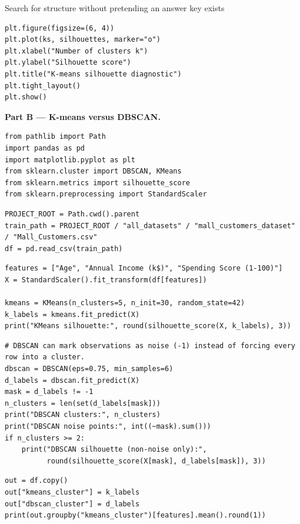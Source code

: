 \begin{labproject}{Search for structure without pretending an answer key exists}
\begin{lstlisting}[style=mlpython]
plt.figure(figsize=(6, 4))
plt.plot(ks, silhouettes, marker="o")
plt.xlabel("Number of clusters k")
plt.ylabel("Silhouette score")
plt.title("K-means silhouette diagnostic")
plt.tight_layout()
plt.show()
\end{lstlisting}

\medskip\noindent\textbf{Part B --- K-means versus DBSCAN.}\par
\begin{lstlisting}[style=mlpython]
from pathlib import Path
import pandas as pd
import matplotlib.pyplot as plt
from sklearn.cluster import DBSCAN, KMeans
from sklearn.metrics import silhouette_score
from sklearn.preprocessing import StandardScaler
\end{lstlisting}

\begin{lstlisting}[style=mlpython]
PROJECT_ROOT = Path.cwd().parent
train_path = PROJECT_ROOT / "all_datasets" / "mall_customers_dataset" / "Mall_Customers.csv"
df = pd.read_csv(train_path)
\end{lstlisting}

\begin{lstlisting}[style=mlpython]
features = ["Age", "Annual Income (k$)", "Spending Score (1-100)"]
X = StandardScaler().fit_transform(df[features])

kmeans = KMeans(n_clusters=5, n_init=30, random_state=42)
k_labels = kmeans.fit_predict(X)
print("KMeans silhouette:", round(silhouette_score(X, k_labels), 3))
\end{lstlisting}

\begin{lstlisting}[style=mlpython]
# DBSCAN can mark observations as noise (-1) instead of forcing every row into a cluster.
dbscan = DBSCAN(eps=0.75, min_samples=6)
d_labels = dbscan.fit_predict(X)
mask = d_labels != -1
n_clusters = len(set(d_labels[mask]))
print("DBSCAN clusters:", n_clusters)
print("DBSCAN noise points:", int((~mask).sum()))
if n_clusters >= 2:
    print("DBSCAN silhouette (non-noise only):",
          round(silhouette_score(X[mask], d_labels[mask]), 3))
\end{lstlisting}

\begin{lstlisting}[style=mlpython]
out = df.copy()
out["kmeans_cluster"] = k_labels
out["dbscan_cluster"] = d_labels
print(out.groupby("kmeans_cluster")[features].mean().round(1))
\end{lstlisting}


\end{labproject}
